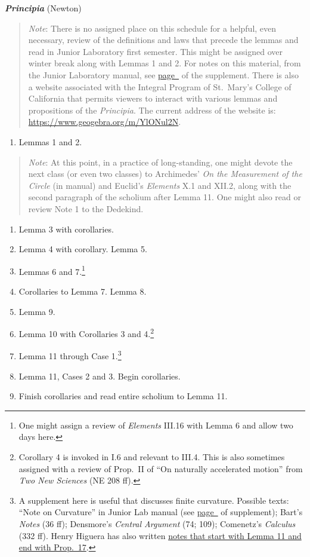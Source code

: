 \documentclass[10pt]{article}
\begin{document}
\textbf{\emph{Principia}} (Newton)
\begin{quote}
{\small\emph{Note}: There is no assigned place on this
	schedule for a helpful, even necessary, review of
	the definitions and laws that precede the lemmas and
	read in Junior Laboratory first semester. This might
	be assigned over winter break along with Lemmas 1
	and 2. For notes on this material, from the Junior
	Laboratory manual, see
	\hyperref[supple.64]{page~\pageref{supple.64}} of
	the supplement. There is also a website associated
	with the Integral Program of St.\ Mary's College of
	California that permits viewers to interact with
	various lemmas and propositions of the \emph{Principia}.
	The current address of the website is: \href{https://www.geogebra.org/m/YlONul2N}{https://www.geogebra.org/m/YlONul2N}.}
\end{quote}
\begin{enumerate}[noitemsep] \item
		Lemmas 1 and 2.  \end{enumerate}
\begin{quote} \small{\emph{Note}: At this point, in a
		practice of long-standing, one might devote
		the next class (or even two classes) to
		Archimedes' \emph{On the Measurement of the
			Circle} (in manual) and Euclid's
		\emph{Elements} X.1 and XII.2, along with
		the second paragraph of the scholium after
		Lemma 11. One might also read or review Note
		1 to the Dedekind.  \label{Dedekind}}
\end{quote}
\begin{enumerate}[resume*] \item Lemma 3 with
		corollaries.  \item Lemma 4 with corollary.
		Lemma 5.  \item Lemmas 6 and 7.\footnote{One
			might assign a review of
			\emph{Elements} III.16 with Lemma 6
			and allow two days here.} \item
		Corollaries to Lemma 7. Lemma 8.  \item
		Lemma 9.  \item Lemma 10 with Corollaries 3
		and 4.\footnote{Corollary 4 is invoked in
			I.6 and relevant to III.4. This is
			also sometimes assigned with a
			review of Prop.~II of ``On naturally
			accelerated motion'' from \emph{Two
				New Sciences} (NE 208 ff).}
	\item Lemma 11 through Case 1.\footnote{A supplement
			here is useful that discusses finite
			curvature. Possible texts: ``Note on
			Curvature'' in Junior Lab manual
			(see
			\hyperref[supple.74]{page~\pageref{supple.74}}
			of supplement); Bart's \emph{Notes}
			(36 ff); Densmore's \emph{Central
				Argument} (74; 109);
			Comenetz's \emph{Calculus} (332 ff).
			Henry Higuera has also written
			\href{https://drive.google.com/file/d/1YZfQPV6poJMzZvZ3DyGfJopGkzy7oe7K/view?usp=sharing}{notes
			that start with Lemma 11 and
			end with Prop.~17}.}
	\item Lemma 11,
		Cases 2 and 3.  Begin corollaries.  \item
		Finish corollaries and read entire scholium
		to Lemma 11.  \end{enumerate}
\end{document}
